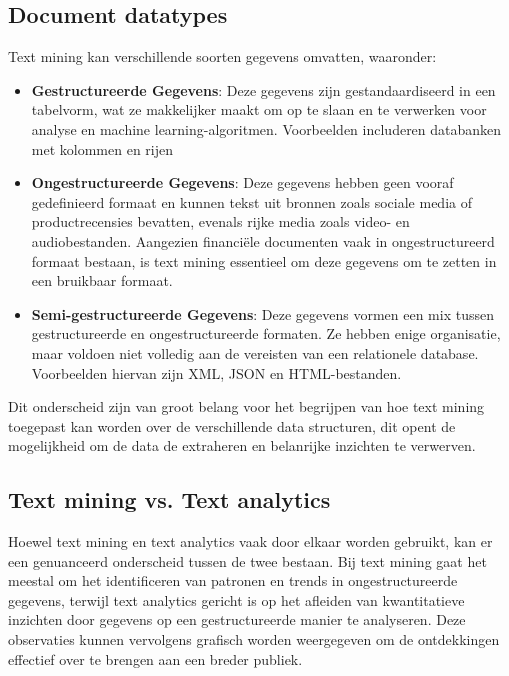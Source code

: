 \subsection{Document datatypes}
Text mining kan verschillende soorten gegevens omvatten, waaronder:

\begin{itemize}
  \item \textbf{Gestructureerde Gegevens}: Deze gegevens zijn gestandaardiseerd in een tabelvorm, wat ze makkelijker maakt om op te slaan en te verwerken voor analyse en machine learning-algoritmen. Voorbeelden includeren databanken met kolommen en rijen%
  \item \textbf{Ongestructureerde Gegevens}: Deze gegevens hebben geen vooraf gedefinieerd formaat en kunnen tekst uit bronnen zoals sociale media of productrecensies bevatten, evenals rijke media zoals video- en audiobestanden. Aangezien financiële documenten vaak in ongestructureerd formaat bestaan, is text mining essentieel om deze gegevens om te zetten in een bruikbaar formaat.
  \item \textbf{Semi-gestructureerde Gegevens}: Deze gegevens vormen een mix tussen gestructureerde en ongestructureerde formaten. Ze hebben enige organisatie, maar voldoen niet volledig aan de vereisten van een relationele database. Voorbeelden hiervan zijn XML, JSON en HTML-bestanden.
\end{itemize}

Dit onderscheid zijn van groot belang voor het begrijpen van hoe text mining toegepast kan worden over de verschillende data structuren, dit opent de mogelijkheid om de data de extraheren en belanrijke inzichten te verwerven\autocite{AWS2024}.

\subsection{Text mining vs. Text analytics}
Hoewel text mining en text analytics vaak door elkaar worden gebruikt, kan er een genuanceerd onderscheid tussen de twee bestaan. Bij text mining gaat het meestal om het identificeren van patronen en trends in ongestructureerde gegevens, terwijl text analytics gericht is op het afleiden van kwantitatieve inzichten door gegevens op een gestructureerde manier te analyseren. Deze observaties kunnen vervolgens grafisch worden weergegeven om de ontdekkingen effectief over te brengen aan een breder publiek.\autocite{IBM2024}
